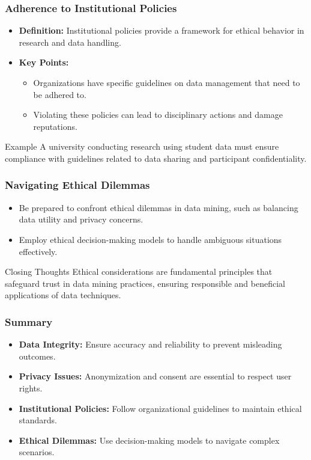 \documentclass[aspectratio=169]{beamer}
\begin{document}
\begin{frame}[fragile]
    \frametitle{Adherence to Institutional Policies}
    \begin{itemize}
        \item \textbf{Definition:} Institutional policies provide a framework for ethical behavior in research and data handling.
        \item \textbf{Key Points:}
        \begin{itemize}
            \item Organizations have specific guidelines on data management that need to be adhered to.
            \item Violating these policies can lead to disciplinary actions and damage reputations.
        \end{itemize}
    \end{itemize}
    \begin{block}{Example}
        A university conducting research using student data must ensure compliance with guidelines related to data sharing and participant confidentiality.
    \end{block}
\end{frame}

\begin{frame}[fragile]
    \frametitle{Navigating Ethical Dilemmas}
    \begin{itemize}
        \item Be prepared to confront ethical dilemmas in data mining, such as balancing data utility and privacy concerns.
        \item Employ ethical decision-making models to handle ambiguous situations effectively.
    \end{itemize}
    \begin{block}{Closing Thoughts}
        Ethical considerations are fundamental principles that safeguard trust in data mining practices, ensuring responsible and beneficial applications of data techniques.
    \end{block}
\end{frame}

\begin{frame}[fragile]
    \frametitle{Summary}
    \begin{itemize}
        \item \textbf{Data Integrity:} Ensure accuracy and reliability to prevent misleading outcomes.
        \item \textbf{Privacy Issues:} Anonymization and consent are essential to respect user rights.
        \item \textbf{Institutional Policies:} Follow organizational guidelines to maintain ethical standards.
        \item \textbf{Ethical Dilemmas:} Use decision-making models to navigate complex scenarios.
    \end{itemize}
\end{frame}
\end{document}
